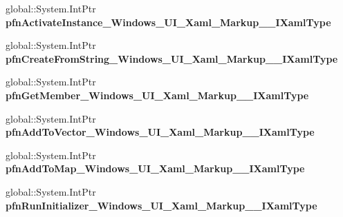 \begin{DoxyCompactItemize}
global\+::\+System.\+Int\+Ptr {\bfseries pfn\+Activate\+Instance\+\_\+\+Windows\+\_\+\+U\+I\+\_\+\+Xaml\+\_\+\+Markup\+\_\+\+\_\+\+I\+Xaml\+Type}
\item 
\mbox{\label{struct_windows_1_1_u_i_1_1_xaml_1_1_markup_1_1_i_xaml_type_____impl_1_1_vtbl_a7b325d47e6d8474146544007bb1a83ad}} 
global\+::\+System.\+Int\+Ptr {\bfseries pfn\+Create\+From\+String\+\_\+\+Windows\+\_\+\+U\+I\+\_\+\+Xaml\+\_\+\+Markup\+\_\+\+\_\+\+I\+Xaml\+Type}
\item 
\mbox{\label{struct_windows_1_1_u_i_1_1_xaml_1_1_markup_1_1_i_xaml_type_____impl_1_1_vtbl_a60532f458106313b5fc836030e1d0664}} 
global\+::\+System.\+Int\+Ptr {\bfseries pfn\+Get\+Member\+\_\+\+Windows\+\_\+\+U\+I\+\_\+\+Xaml\+\_\+\+Markup\+\_\+\+\_\+\+I\+Xaml\+Type}
\item 
\mbox{\label{struct_windows_1_1_u_i_1_1_xaml_1_1_markup_1_1_i_xaml_type_____impl_1_1_vtbl_a13df3fe48915c0ff2fc0d2f9cda3149f}} 
global\+::\+System.\+Int\+Ptr {\bfseries pfn\+Add\+To\+Vector\+\_\+\+Windows\+\_\+\+U\+I\+\_\+\+Xaml\+\_\+\+Markup\+\_\+\+\_\+\+I\+Xaml\+Type}
\item 
\mbox{\label{struct_windows_1_1_u_i_1_1_xaml_1_1_markup_1_1_i_xaml_type_____impl_1_1_vtbl_af5d651554eb750fd52f9849ee1b36b20}} 
global\+::\+System.\+Int\+Ptr {\bfseries pfn\+Add\+To\+Map\+\_\+\+Windows\+\_\+\+U\+I\+\_\+\+Xaml\+\_\+\+Markup\+\_\+\+\_\+\+I\+Xaml\+Type}
\item 
\mbox{\label{struct_windows_1_1_u_i_1_1_xaml_1_1_markup_1_1_i_xaml_type_____impl_1_1_vtbl_a281e521606b9f96a749bd5c59e100815}} 
global\+::\+System.\+Int\+Ptr {\bfseries pfn\+Run\+Initializer\+\_\+\+Windows\+\_\+\+U\+I\+\_\+\+Xaml\+\_\+\+Markup\+\_\+\+\_\+\+I\+Xaml\+Type}
\end{DoxyCompactItemize}
